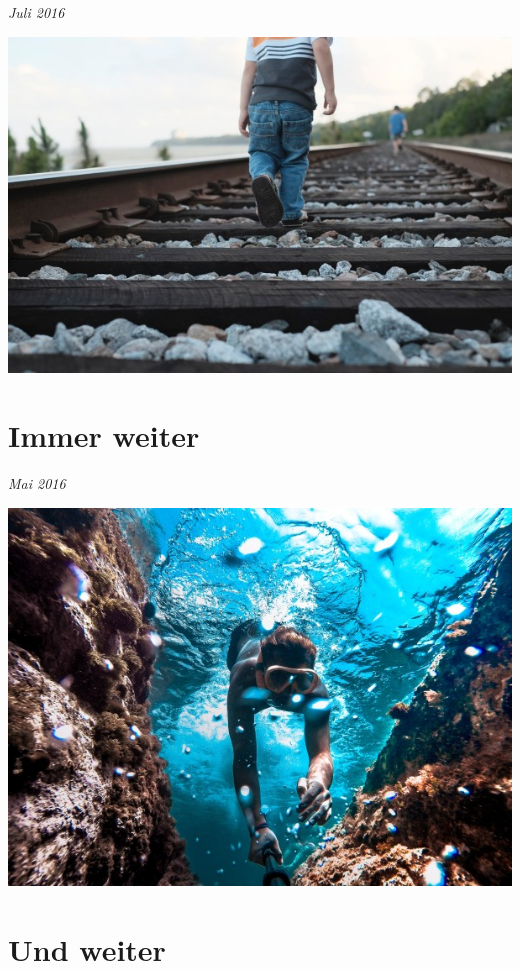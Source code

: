 \documentclass[12pt]{book}
\begin{document}
\blindtext[3]

\blindenumerate

\emph{Juli 2016}

\includegraphics[width=1\textwidth]{images/gleis600x450.jpg}

\chapter{Immer weiter}
\label{chap:Immer weiter}

\Blindtext

\emph{Mai 2016}

\clearpage

\includegraphics[width=1\textwidth]{images/dive600x450.jpg}

\chapter{Und weiter}
\label{chap:Und weiter}
\end{document}
